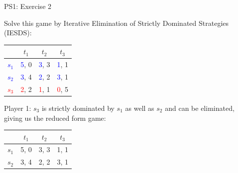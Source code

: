 \begin{frame}{PS1: Exercise 2}
\begin{multicols}{2}
Solve this game by Iterative Elimination of Strictly Dominated Strategies (IESDS):
\begin{table}
  \begin{tabular}{c|c|c|c}
          & $t_1$ & $t_2$ & $t_3$ \\
    \midrule
    \textcolor{blue}{$s_1$} & \textcolor{blue}{5}, 0  & \textcolor{blue}{3}, 3  & \textcolor{blue}{1}, 1 \\
    \midrule
    \textcolor{blue}{$s_2$} & \textcolor{blue}{3}, 4  & \textcolor{blue}{2}, 2  & \textcolor{blue}{3}, 1 \\
    \midrule
    \textcolor{red}{$s_3$} & \textcolor{red}{2}, 2  & \textcolor{red}{1}, 1  & \textcolor{red}{0}, 5
  \end{tabular}
\end{table}
Player 1: $s_3$ is strictly dominated by $s_1$ as well as $s_2$ and can be eliminated, giving us the reduced form game:
\begin{table}
  \begin{tabular}{c|c|c|c}
          & $t_1$ & $t_2$ & $t_3$ \\
    \midrule
    $s_1$ & 5, 0  & 3, 3  & 1, 1 \\
    \midrule
    $s_2$ & 3, 4  & 2, 2  & 3, 1
  \end{tabular}
\end{table}
\vfill\null \columnbreak
\vfill\null
\end{multicols}
\end{frame}

